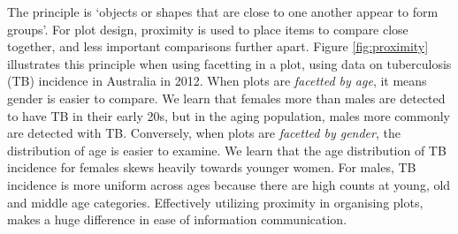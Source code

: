 \documentclass[letterpaper]{ar-1col}\usepackage[]{graphicx}\usepackage[]{color}
\begin{document}
The principle is `objects or shapes that are close to one another appear to form groups'. For plot design, proximity is used to place items to compare close together, and less important comparisons further apart. Figure \ref{fig:proximity} illustrates this principle when using facetting in a plot, using data on tuberculosis (TB) incidence in Australia in 2012. When plots are {\em facetted by age}, it means gender is easier to compare. We  learn that females more than males are detected to have TB in their early 20s, but in the aging population, males more commonly are detected with TB. Conversely, when plots are {\em facetted by gender}, the distribution of age is easier to examine. We  learn that the age distribution of TB incidence for females skews heavily towards younger women. For males, TB incidence is more uniform across ages because there are high counts at young, old and middle age categories. Effectively utilizing proximity in organising plots, makes a huge difference in ease of information communication.
\end{document}
